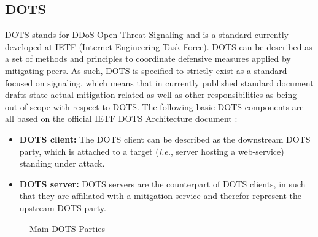 \subsection{DOTS}


DOTS stands for DDoS Open Threat Signaling and is a standard currently developed at IETF (Internet Engineering Task Force). DOTS can be described as a set of methods and principles to coordinate defensive measures applied by mitigating peers. As such, DOTS is specified to strictly exist as a standard focused on signaling, which means that in currently published standard document drafts state actual mitigation-related as well as other responsibilities as being out-of-scope with respect to DOTS. The following basic DOTS components are all based on the official IETF DOTS Architecture document \cite{dots-architecture}:

\begin{itemize}
    \item \textbf{DOTS client:} The DOTS client can be described as the downstream DOTS party, which is attached to a target (\emph{i.e.}, server hosting a web-service) standing under attack.
    \item \textbf{DOTS server:} DOTS servers are the counterpart of DOTS clients, in such that they are affiliated with a mitigation service and therefor represent the upstream DOTS party.
\end{itemize}

\begin{figure}[H]
\label{fig:DOTSarchitecture}
\centering
\caption{Main DOTS Parties \cite{dots-architecture}}
\end{figure}


